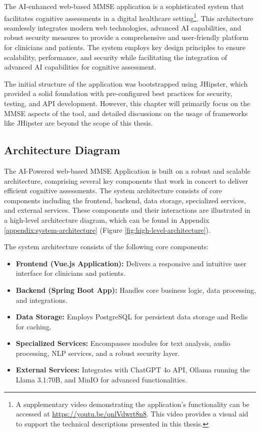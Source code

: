 The AI-enhanced web-based MMSE application is a sophisticated system that facilitates cognitive assessments in a digital healthcare setting\footnote{A supplementary video demonstrating the application's functionality can be accessed at \url{https://youtu.be/qnlVdwrt8n8}. This video provides a visual aid to support the technical descriptions presented in this thesis.}. This architecture seamlessly integrates modern web technologies, advanced AI capabilities, and robust security measures to provide a comprehensive and user-friendly platform for clinicians and patients. The system employs key design principles to ensure scalability, performance, and security while facilitating the integration of advanced AI capabilities for cognitive assessment.

The initial structure of the application was bootstrapped using JHipster, which provided a solid foundation with pre-configured best practices for security, testing, and API development. However, this chapter will primarily focus on the MMSE aspects of the tool, and detailed discussions on the usage of frameworks like JHipster are beyond the scope of this thesis.

\subsection{Architecture Diagram}
The AI-Powered web-based MMSE Application is built on a robust and scalable architecture, comprising several key components that work in concert to deliver efficient cognitive assessments. The system architecture consists of core components including the frontend, backend, data storage, specialized services, and external services. These components and their interactions are illustrated in a high-level architecture diagram, which can be found in Appendix \ref{appendix:system-architecture} (Figure \ref{fig:high-level-architecture}).

The system architecture consists of the following core components:
\begin{itemize}
\item \textbf{Frontend (Vue.js Application):} Delivers a responsive and intuitive user interface for clinicians and patients.
\item \textbf{Backend (Spring Boot App):} Handles core business logic, data processing, and integrations.
\item \textbf{Data Storage:} Employs PostgreSQL for persistent data storage and Redis for caching.
\item \textbf{Specialized Services:} Encompasses modules for text analysis, audio processing, NLP services, and a robust security layer.
\item \textbf{External Services:} Integrates with ChatGPT 4o API, Ollama running the Llama 3.1:70B, and MinIO for advanced functionalities.
\end{itemize}

